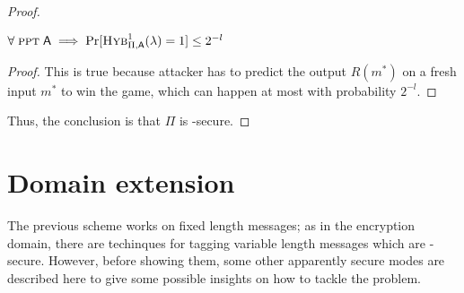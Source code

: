 \begin{proof}
\begin{cryptoredux}
        \cseqbeginloop
        \cseqendloop

        \cseqdelay
    

        \cseqdelay

        
    \end{cryptoredux}

    \begin{lemma}
        $\forall\; \ppt\; \adversary \implies \Pr[\hybridg{1}(\lambda) = 1] \leq 2^{-l}$
    \end{lemma}

    \begin{proof}
        This is true because attacker has to predict the output $R(m^*)$ on a fresh input $m^*$ to win the game, which can happen at most with probability $2^{-l}$.
    \end{proof}

    Thus, the conclusion is that $\Pi$ is \ufcma-secure.
\end{proof}

\pagebreak

\section{Domain extension}

The previous scheme works on fixed length messages; as in the encryption domain, there are techinques for tagging variable length messages which are \ufcma-secure. However, before showing them, some other apparently secure modes are described here to give some possible insights on how to tackle the problem. 

